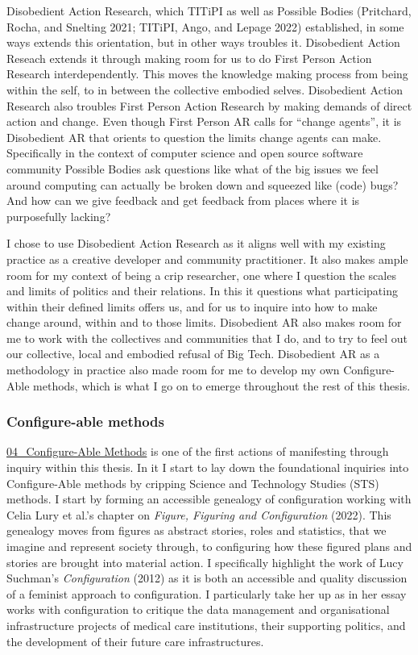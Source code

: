 Disobedient Action Research, which TITiPI as well as Possible Bodies
(Pritchard, Rocha, and Snelting 2021; TITiPI, Ango, and Lepage 2022)
established, in some ways extends this orientation, but in other ways
troubles it. Disobedient Action Reseach extends it through making room
for us to do First Person Action Research interdependently. This moves
the knowledge making process from being within the self, to in between
the collective embodied selves. Disobedient Action Research also
troubles First Person Action Research by making demands of direct action
and change. Even though First Person AR calls for ``change agents'', it
is Disobedient AR that orients to question the limits change agents can
make. Specifically in the context of computer science and open source
software community Possible Bodies ask questions like what of the big
issues we feel around computing can actually be broken down and squeezed
like (code) bugs? And how can we give feedback and get feedback from
places where it is purposefully lacking?

I chose to use Disobedient Action Research as it aligns well with my
existing practice as a creative developer and community practitioner. It
also makes ample room for my context of being a crip researcher, one
where I question the scales and limits of politics and their relations.
In this it questions what participating within their defined limits
offers us, and for us to inquire into how to make change around, within
and to those limits. Disobedient AR also makes room for me to work with
the collectives and communities that I do, and to try to feel out our
collective, local and embodied refusal of Big Tech. Disobedient AR as a
methodology in practice also made room for me to develop my own
Configure-Able methods, which is what I go on to emerge throughout the
rest of this thesis.

\hypertarget{configure-able-methods}{%
\subsubsection{Configure-able methods}\label{configure-able-methods}}

\href{../../04_Configure-able_Methods/04_Configure-Able\%20Methods.md}{04\_Configure-Able
Methods} is one of the first actions of manifesting through inquiry
within this thesis. In it I start to lay down the foundational inquiries
into Configure-Able methods by cripping Science and Technology Studies
(STS) methods. I start by forming an accessible genealogy of
configuration working with Celia Lury et al.'s chapter on \emph{Figure,
Figuring and Configuration} (2022). This genealogy moves from figures as
abstract stories, roles and statistics, that we imagine and represent
society through, to configuring how these figured plans and stories are
brought into material action. I specifically highlight the work of Lucy
Suchman's \emph{Configuration} (2012) as it is both an accessible and
quality discussion of a feminist approach to configuration. I
particularly take her up as in her essay works with configuration to
critique the data management and organisational infrastructure projects
of medical care institutions, their supporting politics, and the
development of their future care infrastructures.


